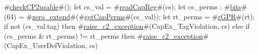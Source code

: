 #\hyperref[sailMIPSzcheckCP2usable]{checkCP2usable}#();
let cs_val = #\hyperref[sailMIPSzreadCapReg]{readCapReg}#(cs);
let cs_perms : #\hyperref[sailMIPSzbits]{bits}#(64) = #\hyperref[sailMIPSzzzerozyextend]{zero\_extend}#(#\hyperref[sailMIPSzgetCapPerms]{getCapPerms}#(cs_val));
let rt_perms = #\hyperref[sailMIPSzrGPR]{rGPR}#(rt);
if not (cs_val.tag) then
  #\hyperref[sailMIPSzraisezyc2zyexception]{raise\_c2\_exception}#(CapEx_TagViolation, cs)
else if (cs_perms & rt_perms) != rt_perms then
  #\hyperref[sailMIPSzraisezyc2zyexception]{raise\_c2\_exception}#(CapEx_UserDefViolation, cs)
